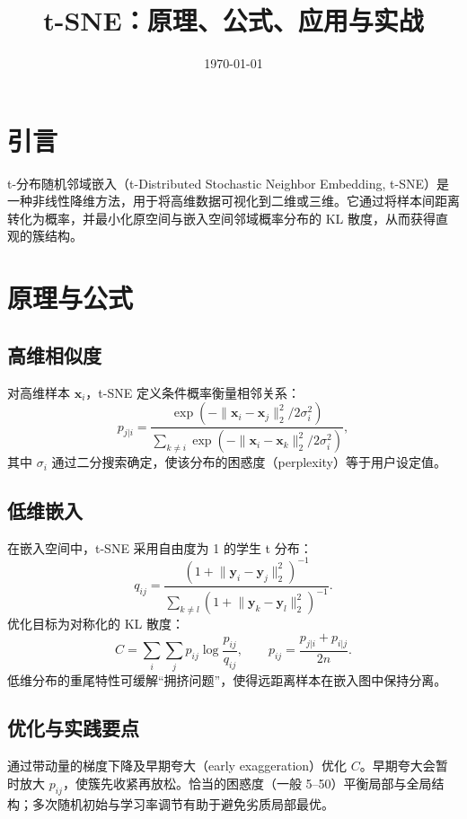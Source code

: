 \documentclass[UTF8,zihao=-4]{ctexart}
\title{t-SNE：原理、公式、应用与实战}
\author{}
\date{\today}
\begin{document}
\maketitle

\section{引言}
t-分布随机邻域嵌入（t-Distributed Stochastic Neighbor Embedding, t-SNE）是一种非线性降维方法，用于将高维数据可视化到二维或三维。它通过将样本间距离转化为概率，并最小化原空间与嵌入空间邻域概率分布的 KL 散度，从而获得直观的簇结构。

\section{原理与公式}
\subsection{高维相似度}
对高维样本 \(\mathbf{x}_i\)，t-SNE 定义条件概率衡量相邻关系：
\begin{equation}
p_{j|i} = \frac{\exp\left(-\lVert \mathbf{x}_i - \mathbf{x}_j \rVert_2^2 / 2\sigma_i^2\right)}{\sum_{k \neq i} \exp\left(-\lVert \mathbf{x}_i - \mathbf{x}_k \rVert_2^2 / 2\sigma_i^2\right)},
\end{equation}
其中 \(\sigma_i\) 通过二分搜索确定，使该分布的困惑度（perplexity）等于用户设定值。

\subsection{低维嵌入}
在嵌入空间中，t-SNE 采用自由度为 1 的学生 t 分布：
\begin{equation}
q_{ij} = \frac{\left(1 + \lVert \mathbf{y}_i - \mathbf{y}_j \rVert_2^2\right)^{-1}}{\sum_{k \neq l} \left(1 + \lVert \mathbf{y}_k - \mathbf{y}_l \rVert_2^2\right)^{-1}}.
\end{equation}
优化目标为对称化的 KL 散度：
\begin{equation}
C = \sum_i \sum_j p_{ij} \log \frac{p_{ij}}{q_{ij}}, \qquad p_{ij} = \frac{p_{j|i} + p_{i|j}}{2n}.
\end{equation}
低维分布的重尾特性可缓解“拥挤问题”，使得远距离样本在嵌入图中保持分离。

\subsection{优化与实践要点}
通过带动量的梯度下降及早期夸大（early exaggeration）优化 \(C\)。早期夸大会暂时放大 \(p_{ij}\)，使簇先收紧再放松。恰当的困惑度（一般 5--50）平衡局部与全局结构；多次随机初始与学习率调节有助于避免劣质局部最优。
\end{document}
